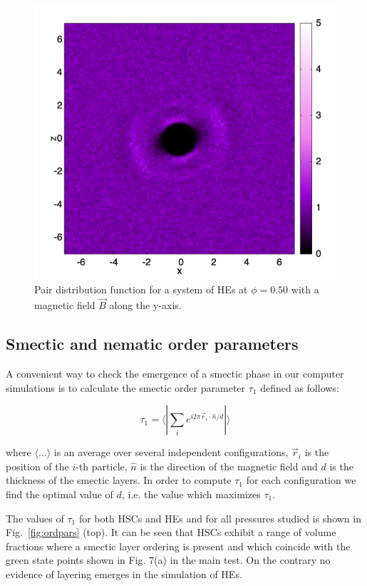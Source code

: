 \documentclass[aip,graphicx]{revtex4-1} %
\begin{document}
\begin{figure}
    \centering
    \includegraphics[width=0.4\columnwidth]{gxz_B_HE.png}
    \caption{Pair distribution function for a system of HEs at $\phi = 0.50$ with a magnetic field $\vec{B}$ along the y-axis.}\label{fig:gxz_B_HE}
\end{figure}

\subsection{Smectic and nematic order parameters}

A convenient way to check the emergence of a smectic phase in our computer simulations 
is to calculate the smectic order parameter $\tau_1$ defined as follows:

\begin{equation}
    \tau_1 = \langle | \sum_i e^{i 2\pi \vec{r}_i \cdot \hat{n} / d } |\rangle 
\end{equation}

where $\langle\ldots\rangle$ is an average over several independent configurations, $\vec{r}_i$ is the position of the $i$-th particle, $\hat{n}$ is the direction of the magnetic
field and $d$ is the thickness of the smectic layers.
In order to compute $\tau_1$ for each configuration we find the optimal value of $d$, i.e. 
the value which maximizes $\tau_1$.

The values of $\tau_1$ for both HSCs and HEs and for all pressures studied is shown in Fig.~\ref{fig:ordpars} (top). It can be seen that HSCs exhibit a range of volume fractions where 
a smectic layer ordering is present and which coincide with the green state points shown in Fig. 7(a)
in the main test. On the contrary no evidence of layering emerges in the simulation of HEs.
\end{document}
